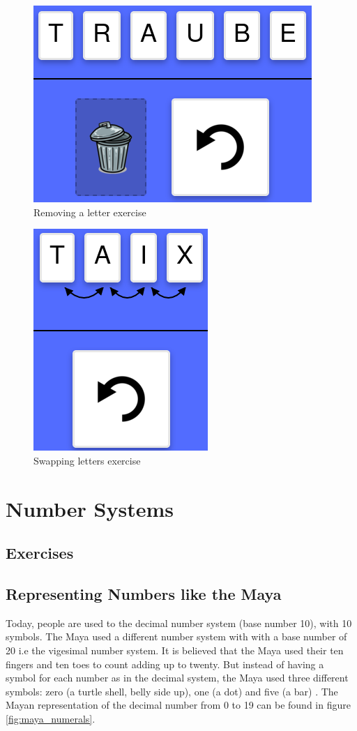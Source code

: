 \begin{figure} 
  \centering
  \includegraphics[width=0.3 \columnwidth]{figures/words_remove.png}
  \caption{Removing a letter exercise} 
  \label{fig:removingLetter} 
\end{figure}

\begin{figure} 
  \centering
  \includegraphics[width=0.2 \columnwidth]{figures/words_swap.png}
  \caption{Swapping letters exercise} 
  \label{fig:swappingLetters} 
\end{figure}

\section{Number Systems}
\label{section:numberSystems}

\subsection{Exercises}
\subsection*{Representing Numbers like the Maya}

Today, people are used to the decimal number system (base number 10), with 10 symbols. The Maya used a different number system with with a base number of 20 i.e the vigesimal number system. It is believed that the Maya used their ten fingers and ten toes to count adding up to twenty. But instead of having a symbol for each number as in the decimal system, the Maya used three different symbols: zero (a turtle shell, belly side up), one (a dot) and five (a bar) \cite{Maya}. The Mayan representation of the decimal number from 0 to 19 can be found in figure \ref{fig:maya_numerals}.

